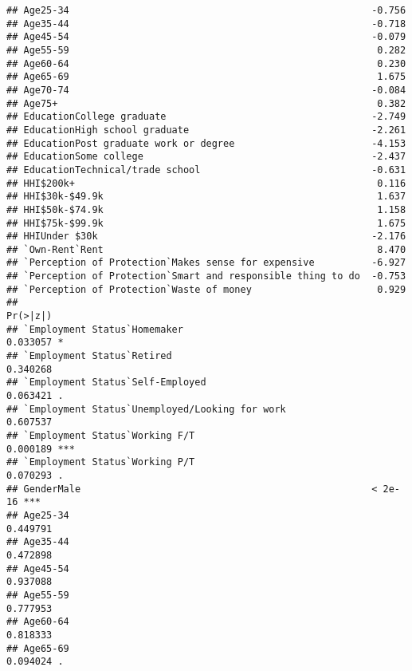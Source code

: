 \documentclass[]{article}
\begin{document}
\begin{verbatim}
## Age25-34                                                     -0.756
## Age35-44                                                     -0.718
## Age45-54                                                     -0.079
## Age55-59                                                      0.282
## Age60-64                                                      0.230
## Age65-69                                                      1.675
## Age70-74                                                     -0.084
## Age75+                                                        0.382
## EducationCollege graduate                                    -2.749
## EducationHigh school graduate                                -2.261
## EducationPost graduate work or degree                        -4.153
## EducationSome college                                        -2.437
## EducationTechnical/trade school                              -0.631
## HHI$200k+                                                     0.116
## HHI$30k-$49.9k                                                1.637
## HHI$50k-$74.9k                                                1.158
## HHI$75k-$99.9k                                                1.675
## HHIUnder $30k                                                -2.176
## `Own-Rent`Rent                                                8.470
## `Perception of Protection`Makes sense for expensive          -6.927
## `Perception of Protection`Smart and responsible thing to do  -0.753
## `Perception of Protection`Waste of money                      0.929
##                                                             Pr(>|z|)    
## `Employment Status`Homemaker                                0.033057 *  
## `Employment Status`Retired                                  0.340268    
## `Employment Status`Self-Employed                            0.063421 .  
## `Employment Status`Unemployed/Looking for work              0.607537    
## `Employment Status`Working F/T                              0.000189 ***
## `Employment Status`Working P/T                              0.070293 .  
## GenderMale                                                   < 2e-16 ***
## Age25-34                                                    0.449791    
## Age35-44                                                    0.472898    
## Age45-54                                                    0.937088    
## Age55-59                                                    0.777953    
## Age60-64                                                    0.818333    
## Age65-69                                                    0.094024 .  

\end{verbatim}
\end{document}
